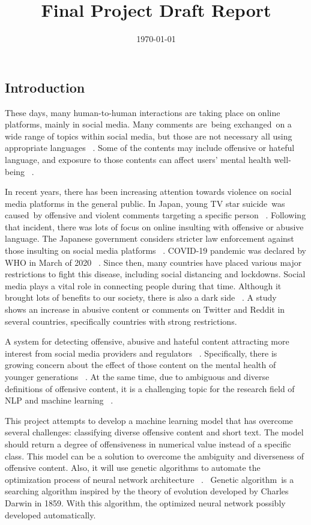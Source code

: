 \documentclass[11pt, natbib=false]{article}
\date{\today}
\title{Final Project Draft Report}
\begin{document}
\maketitle

\begin{multicols}{2}
\section{Introduction}
These days, many human-to-human interactions are taking place on online platforms, mainly in social media.
Many comments are being exchanged on a wide range of topics within social media, but those are not necessary all using appropriate languages ~\cite{hada2021ruddit}.
Some of the contents may include offensive or hateful language, and exposure to those contents can affect users’ mental health well-being ~\cite{hada2021ruddit}.

In recent years, there has been increasing attention towards violence on social media platforms in the general public.
In Japan, young TV star suicide was caused by offensive and violent comments targeting a specific person ~\cite{HanaK}.
Following that incident, there was lots of focus on online insulting with offensive or abusive language. The Japanese government considers stricter law enforcement against those insulting on social media platforms ~\cite{JpGov}.
COVID-19 pandemic was declared by WHO in March of 2020 ~\cite{whoCovid}.
Since then, many countries have placed various major restrictions to fight this disease, including social distancing and lockdowns. Social media plays a vital role in connecting people during that time. Although it brought lots of benefits to our society, there is also a dark side ~\cite{liu2021covid}.
A study ~\cite{babvey2021using} shows an increase in abusive content or comments on Twitter and Reddit in several countries, specifically countries with strong restrictions.

A system for detecting offensive, abusive and hateful content attracting more interest from social media providers and regulators ~\cite{vidgen2019challenges}.
Specifically, there is growing concern about the effect of those content on the mental health of younger generations ~\cite{babvey2021using}.
At the same time, due to ambiguous and diverse definitions of offensive content, it is a challenging topic for the research field of NLP and machine learning ~\cite{vidgen2019challenges}.

This project attempts to develop a machine learning model that has overcome several challenges: classifying diverse offensive content and short text.
The model should return a degree of offensiveness in numerical value instead of a specific class.
This model can be a solution to overcome the ambiguity and diverseness of offensive content.
Also, it will use genetic algorithms to automate the optimization process of neural network architecture ~\cite{andersen2021evolving}. 
Genetic algorithm is a searching algorithm inspired by the theory of evolution developed by Charles Darwin in 1859.
With this algorithm, the optimized neural network possibly developed automatically.


\end{multicols}
\end{document}
